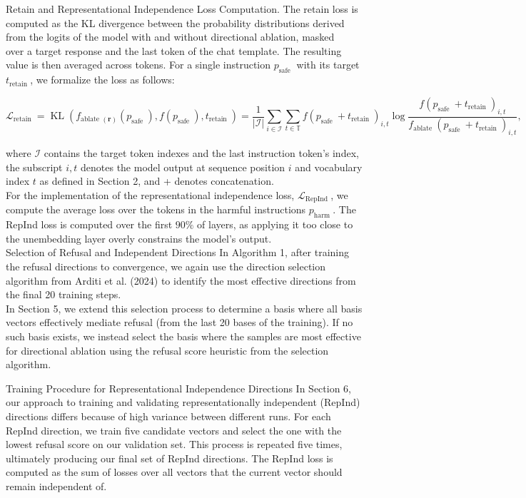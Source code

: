 \documentclass[10pt]{article}
\begin{document}
Retain and Representational Independence Loss Computation. The retain loss is computed as the KL divergence between the probability distributions derived from the logits of the model with and without directional ablation, masked\\
over a target response and the last token of the chat template. The resulting value is then averaged across tokens. For a single instruction $p_{\text {safe }}$ with its target $t_{\text {retain }}$, we formalize the loss as follows:

$$
\mathcal{L}_{\text {retain }}=\operatorname{KL}\left(f_{\text {ablate }(\boldsymbol{r})}\left(p_{\text {safe }}\right), f\left(p_{\text {safe }}\right), t_{\text {retain }}\right)=\frac{1}{|\mathcal{I}|} \sum_{i \in \mathcal{I}} \sum_{t \in \mathbb{T}} f\left(p_{\text {safe }}+t_{\text {retain }}\right)_{i, t} \log \frac{f\left(p_{\text {safe }}+t_{\text {retain }}\right)_{i, t}}{f_{\text {ablate }}\left(p_{\text {safe }}+t_{\text {retain }}\right)_{i, t}},
$$

where $\mathcal{I}$ contains the target token indexes and the last instruction token's index, the subscript $i, t$ denotes the model output at sequence position $i$ and vocabulary index $t$ as defined in Section 2, and + denotes concatenation.\\
For the implementation of the representational independence loss, $\mathcal{L}_{\text {RepInd }}$, we compute the average loss over the tokens in the harmful instructions $p_{\text {harm }}$. The RepInd loss is computed over the first $90 \%$ of layers, as applying it too close to the unembedding layer overly constrains the model's output.\\
Selection of Refusal and Independent Directions In Algorithm 1, after training the refusal directions to convergence, we again use the direction selection algorithm from Arditi et al. (2024) to identify the most effective directions from the final 20 training steps.\\
In Section 5, we extend this selection process to determine a basis where all basis vectors effectively mediate refusal (from the last 20 bases of the training). If no such basis exists, we instead select the basis where the samples are most effective for directional ablation using the refusal score heuristic from the selection algorithm.

Training Procedure for Representational Independence Directions In Section 6, our approach to training and validating representationally independent (RepInd) directions differs because of high variance between different runs. For each RepInd direction, we train five candidate vectors and select the one with the lowest refusal score on our validation set. This process is repeated five times, ultimately producing our final set of RepInd directions. The RepInd loss is computed as the sum of losses over all vectors that the current vector should remain independent of.
\end{document}

